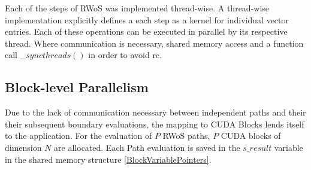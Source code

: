 Each of the steps of \Gls{RWoS} was implemented thread-wise.  A thread-wise implementation
explicitly defines a each step as a kernel for individual vector entries.  Each of these operations
can be executed in parallel by its respective thread.  Where communication is necessary,
shared memory access and a function call $\_\_syncthreads()$ in order to avoid \Gls{rc}.

\subsection{Block-level Parallelism}
Due to the lack of communication necessary between independent paths and their
their subsequent boundary evaluations, the mapping to \Gls{CUDA} Blocks lends itself
to the  application.  For the evaluation of $P$ \Gls{RWoS} paths, $P$ CUDA blocks
of dimension $N$ are allocated.  Each Path evaluation is saved in the $s\_result$
variable in the shared memory structure \ref{BlockVariablePointers}.

